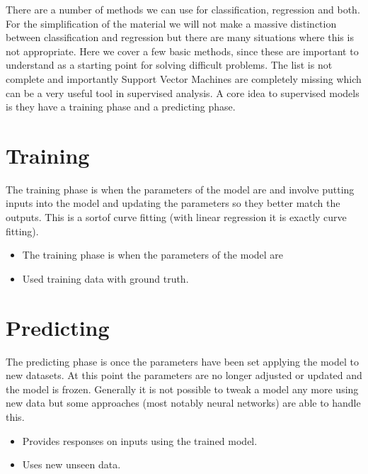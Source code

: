 \documentclass[letterpaper,10pt,english]{sphinxmanual}
\begin{document}
\sphinxAtStartPar
There are a number of methods we can use for classification, regression and both. For the simplification of the material we will not make a massive distinction between classification and regression but there are many situations where this is not appropriate. Here we cover a few basic methods, since these are important to understand as a starting point for solving difficult problems. The list is not complete and importantly Support Vector Machines are completely missing which can be a very useful tool in supervised analysis.
A core idea to supervised models is they have a training phase and a predicting phase.


\section{Training}
\label{\detokenize{05-SupervisedSegmentation:training}}
\sphinxAtStartPar
The training phase is when the parameters of the model are  and involve putting inputs into the model and updating the parameters so they better match the outputs. This is a sort\sphinxhyphen{}of curve fitting (with linear regression it is exactly curve fitting).
\begin{itemize}
\item {} 
\sphinxAtStartPar
The training phase is when the parameters of the model are 

\item {} 
\sphinxAtStartPar
Used training data with ground truth.

\end{itemize}


\section{Predicting}
\label{\detokenize{05-SupervisedSegmentation:predicting}}
\sphinxAtStartPar
The predicting phase is once the parameters have been set applying the model to new datasets. At this point the parameters are no longer adjusted or updated and the model is frozen. Generally it is not possible to tweak a model any more using new data but some approaches (most notably neural networks) are able to handle this.
\begin{itemize}
\item {} 
\sphinxAtStartPar
Provides responses on inputs using the trained model.

\item {} 
\sphinxAtStartPar
Uses new unseen data.

\end{itemize}
\end{document}
